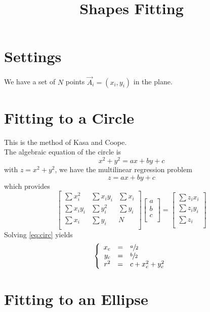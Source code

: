 \documentclass[aps]{revtex4}
\begin{document}
\title{Shapes Fitting}

\section{Settings}

We have a set of $N$ points $\vec{A}_i = (x_i,y_i)$ in the plane.

\section{Fitting to a Circle}
This is the method of Kasa and Coope.\\
The algebraic equation of the circle is
\begin{equation}
	x^2+y^2 = ax+by+c
\end{equation}
with $z = x^2+y^2$, we have the multilinear regression problem
\begin{equation}
	z = ax+by+c
\end{equation}
which provides
\begin{equation}
	\label{eq:circ}
	\begin{bmatrix}
	\sum x_i^2 & \sum x_iy_i & \sum x_i\\
	\sum x_iy_i & \sum y_i^2 & \sum y_i\\
	\sum x_i    & \sum y_i & N \\
	\end{bmatrix}
	\begin{bmatrix}
	a\\
	b\\
	c\\
	\end{bmatrix}
	=
	\begin{bmatrix}
	\sum z_i x_i\\
	\sum z_i y_i\\
	\sum z_i\\
	\end{bmatrix}
\end{equation}
Solving \eqref{eq:circ} yields
\begin{equation}
	\left\lbrace
	\begin{array}{rcl}
	x_c & = & \sfrac{a}{2}\\
	y_c & = & \sfrac{b}{2}\\
	r^2 & = & {c}+x_c^2+y_c^2\\
	\end{array}
	\right.
\end{equation}

\section{Fitting to an Ellipse}
\end{document}
